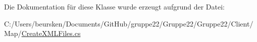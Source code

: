 Die Dokumentation für diese Klasse wurde erzeugt aufgrund der Datei\-:\begin{DoxyCompactItemize}
\item 
C\-:/\-Users/beursken/\-Documents/\-Git\-Hub/gruppe22/\-Gruppe22/\-Gruppe22/\-Client/\-Map/\hyperlink{_create_x_m_l_files_8cs}{Create\-X\-M\-L\-Files.\-cs}\end{DoxyCompactItemize}
